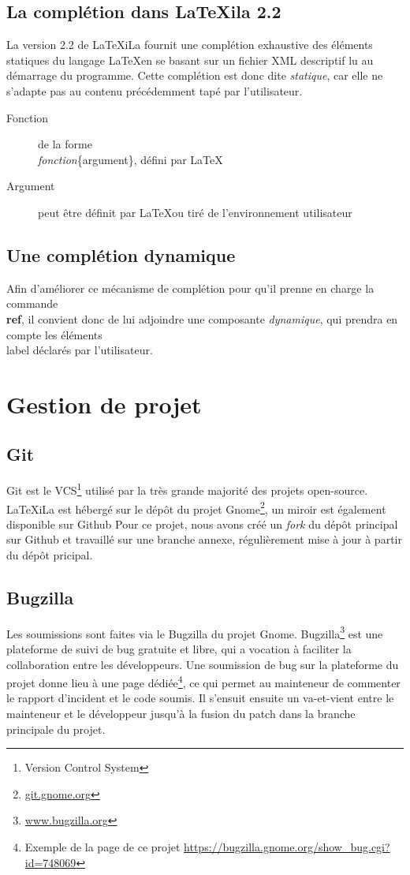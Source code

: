 \documentclass[a4paper,11pt]{report}
\begin{document}
\subsection{La complétion dans LaTeXila 2.2}
\label{sub:completion}
La version 2.2 de LaTeXiLa fournit une complétion exhaustive des éléments statiques du langage \LaTeX  en se basant sur un fichier XML descriptif lu au démarrage du programme.
Cette complétion est donc dite \textit{statique}, car elle ne s'adapte pas au contenu précédemment tapé par l'utilisateur. 

\begin{description}
  \item[Fonction] de la forme \\\textit{fonction}\{argument\}, défini par \LaTeX
  \item[Argument] peut être définit par \LaTeX  ou tiré de l'environnement utilisateur
\end{description}

\subsection{Une complétion dynamique}
\label{sub:completion_dyn}
Afin d'améliorer ce mécanisme de complétion pour qu'il prenne en charge la commande \textbf{\\ref}, il convient donc de lui adjoindre une composante \textit{dynamique}, qui prendra en compte les éléments \\label déclarés par l'utilisateur.

\section{Gestion de projet} %

\subsection{Git}
\label{sub:git}
Git est le VCS\footnote{Version Control System} utilisé par la très grande majorité des projets open-source. LaTeXiLa est hébergé sur le dépôt du projet Gnome\footnote{\url{git.gnome.org}}, un miroir est également disponible sur Github %
Pour ce projet, nous avons créé un \textit{fork} du dépôt principal sur Github et travaillé sur une branche annexe, régulièrement mise à jour à partir du dépôt pricipal.

\subsection{Bugzilla}
Les soumissions sont faites via le Bugzilla du projet Gnome. %
Bugzilla\footnote{\url{www.bugzilla.org}} est une plateforme de suivi de bug gratuite et libre, qui a vocation à faciliter la collaboration entre les développeurs.
Une soumission de bug sur la plateforme du projet donne lieu à une page dédiée\footnote{Exemple de la page de ce projet \url{https://bugzilla.gnome.org/show_bug.cgi?id=748069}}, ce qui permet au mainteneur de commenter le rapport d'incident et le code soumis.
Il s'ensuit ensuite un va-et-vient entre le mainteneur et le développeur jusqu'à la fusion du patch dans la branche principale du projet.
\end{document}
